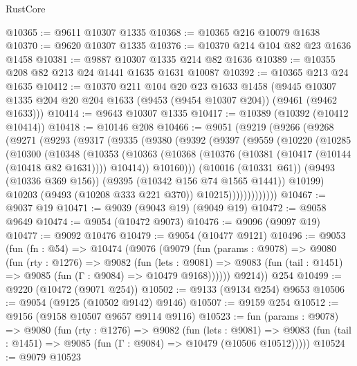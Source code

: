 \begin{lexlean}{RustCore}
\begin{coremodule}
@10365 := @9611 @10307 @1335
@10368 := @10365 @216 @10079 @1638
@10370 := @9620 @10307 @1335
@10376 := @10370 @214 @104 @82 @23 @1636 @1458
@10381 := @9887 @10307 @1335 @214 @82 @1636
@10389 := @10355 @208 @82 @213 @24 @1441 @1635 @1631 @10087
@10392 := @10365 @213 @24 @1635
@10412 := @10370
    @211
    @104
    @20
    @23
    @1633
    @1458
    (@9445 @10307 @1335 @204 @20 @204 @1633 (@9453 (@9454 @10307 @204)) (@9461 (@9462 @1633)))
@10414 := @9643 @10307 @1335
@10417 := @10389 (@10392 (@10412 @10414))
@10418 := @10146 @208
@10466 := @9051
    (@9219
      (@9266
        (@9268
          (@9271
            (@9293
              (@9317
                (@9335
                  (@9380
                    (@9392
                      (@9397
                        (@9559
                          (@10220
                            (@10285
                              (@10300
                                (@10348
                                  (@10353
                                    (@10363
                                      (@10368
                                        (@10376
                                          (@10381 (@10417 (@10144 (@10418 @82 @1631))))
                                          @10414))
                                      @10160)))
                                (@10016 (@10331 @61))
                                (@9493 (@10336 @369 @156))
                                (@9395 (@10342 @156 @74 @1565 @1441))
                                @10199)
                              @10203
                              (@9493 (@10208 @333 @221 @370))
                              @10215)))))))))))))
@10467 := @9037 @19
@10471 := @9039 (@9043 @19) (@9049 @19)
@10472 := @9058 @9649
@10474 := @9054 (@10472 @9073)
@10476 := @9096 (@9097 @19)
@10477 := @9092 @10476
@10479 := @9054 (@10477 @9121)
@10496 := @9053
    (fun (fn : @54) =>
    @10474
      (@9076
        (@9079
          (fun (params : @9078) =>
          @9080
            (fun (rty : @1276) =>
            @9082
              (fun (lets : @9081) =>
              @9083 (fun (tail : @1451) => @9085 (fun (Γ : @9084) => @10479 @9168))))))
        @9214))
    @254
@10499 := @9220 (@10472 (@9071 @254))
@10502 := @9133 (@9134 @254) @9653
@10506 := @9054 (@9125 (@10502 @9142) @9146)
@10507 := @9159 @254
@10512 := @9156 (@9158 @10507 @9657 @9114 @9116)
@10523 := fun (params : @9078) =>
  @9080
    (fun (rty : @1276) =>
    @9082
      (fun (lets : @9081) =>
      @9083 (fun (tail : @1451) => @9085 (fun (Γ : @9084) => @10479 (@10506 @10512)))))
@10524 := @9079 @10523

\end{coremodule}
\end{lexlean}

